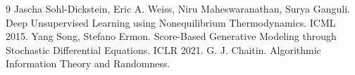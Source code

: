 \documentclass[11pt]{article}
\begin{document}

\begin{thebibliography}{9}
 Jascha Sohl-Dickstein, Eric A. Weiss, Niru Maheswaranathan, Surya Ganguli.
Deep Unsupervised Learning using Nonequilibrium Thermodynamics. ICML 2015.
 Yang Song, Stefano Ermon. Score-Based Generative Modeling through
Stochastic Differential Equations. ICLR 2021.
 G. J. Chaitin. Algorithmic Information Theory and Randomness.
\end{thebibliography}
\end{document}
